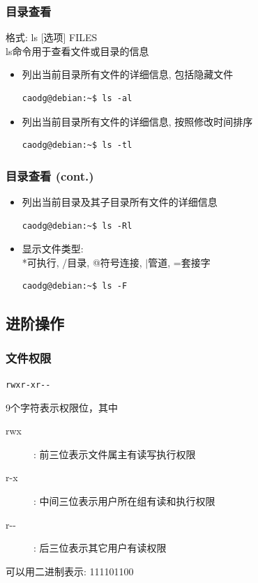 \documentclass[compress]{beamer}
\begin{document}
\begin{frame}[containsverbatim]
\frametitle{目录查看}

格式: \alert{ls} [选项] FILES \\
\alert{ls}命令用于查看文件或目录的信息

\begin{itemize}
\item 列出当前目录所有文件的详细信息, 包括隐藏文件\\
\begin{Verbatim}
caodg@debian:~$ ls -al
\end{Verbatim}

\item 列出当前目录所有文件的详细信息, 按照修改时间排序\\
\begin{Verbatim}
caodg@debian:~$ ls -tl
\end{Verbatim}

\end{itemize}


\end{frame}


\begin{frame}[containsverbatim]
\frametitle{目录查看 (cont.)}

\begin{itemize}

\item 列出当前目录及其子目录所有文件的详细信息\\
\begin{Verbatim}
caodg@debian:~$ ls -Rl
\end{Verbatim}

\item 显示文件类型: \\
  *可执行, /目录, @符号连接, $|$管道, =套接字\\
\begin{Verbatim}
caodg@debian:~$ ls -F
\end{Verbatim}

\end{itemize}

\end{frame}

\subsection{进阶操作}

\begin{frame}[containsverbatim]
\frametitle{文件权限}

{\Large{\verb=rwxr-xr--=}}

9个字符表示权限位，其中
\begin{description}
\item [rwx]: 前三位表示文件属主有读写执行权限
\item [r-x]: 中间三位表示用户所在组有读和执行权限
\item [r-{}-]: 后三位表示其它用户有读权限
\end{description}

可以用二进制表示: 111\alert{101}100

\end{frame}
\end{document}
